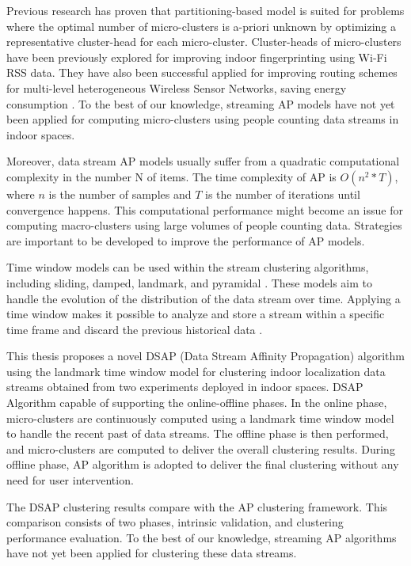 Previous research has proven that partitioning-based model is suited for problems where the optimal number of micro-clusters is a-priori unknown by optimizing a representative cluster-head for each micro-cluster. Cluster-heads of micro-clusters have been previously explored for improving indoor fingerprinting using Wi-Fi RSS data\cite{hu2015improving, subedi2019improving}. They have also been successful applied for improving routing schemes for multi-level heterogeneous Wireless Sensor Networks, saving energy consumption \cite{wang2019affinity}. To the best of our knowledge,  streaming AP models have not yet been applied for computing micro-clusters using people counting data streams in indoor spaces.  

Moreover, data stream AP models usually suffer from a quadratic computational complexity in the number N of items. The time complexity of AP is $O(n^2*T)$, where $n$ is the number of samples and $T$ is the number of iterations until convergence happens\cite{refianti2017time}. This computational performance might become an issue for computing macro-clusters using large volumes of people counting data. Strategies are important to be developed to improve the performance of AP models. 

Time window models can be used within the stream clustering algorithms, including sliding, damped, landmark, and pyramidal \cite{nguyen2015survey}. These models aim to handle the evolution of the distribution of the data stream over time. Applying a time window makes it possible to analyze and store a stream within a specific time frame and discard the previous historical data \cite{mansalis2018evaluation}.

This thesis proposes a novel DSAP (Data Stream Affinity Propagation) algorithm using the landmark time window model for clustering indoor localization data streams obtained from two experiments deployed in indoor spaces. DSAP Algorithm capable of supporting the online-offline phases. In the online phase, micro-clusters are continuously computed using a landmark time window model to handle the recent past of data streams. The offline phase is then performed, and micro-clusters are computed to deliver the overall clustering results. During offline phase, AP algorithm is adopted to deliver the final clustering without any need for user intervention.

The DSAP clustering results compare with the AP clustering framework. This comparison consists of two phases, intrinsic validation, and clustering performance evaluation.
To the best of our knowledge, streaming AP algorithms have not yet been applied for clustering these data streams. 

